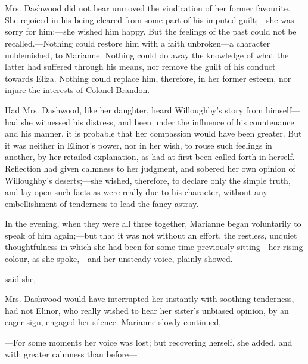 \chapter{} %

Mrs. Dashwood did not hear unmoved the vindication of her former favourite. She rejoiced in his being cleared from some part of his imputed guilt;---she was sorry for him;---she wished him happy. But the feelings of the past could not be recalled.---Nothing could restore him with a faith unbroken---a character unblemished, to Marianne. Nothing could do away the knowledge of what the latter had suffered through his means, nor remove the guilt of his conduct towards Eliza. Nothing could replace him, therefore, in her former esteem, nor injure the interests of Colonel Brandon.

Had Mrs. Dashwood, like her daughter, heard Willoughby's story from himself---had she witnessed his distress, and been under the influence of his countenance and his manner, it is probable that her compassion would have been greater. But it was neither in Elinor's power, nor in her wish, to rouse such feelings in another, by her retailed explanation, as had at first been called forth in herself. Reflection had given calmness to her judgment, and sobered her own opinion of Willoughby's deserts;---she wished, therefore, to declare only the simple truth, and lay open such facts as were really due to his character, without any embellishment of tenderness to lead the fancy astray.

In the evening, when they were all three together, Marianne began voluntarily to speak of him again;---but that it was not without an effort, the restless, unquiet thoughtfulness in which she had been for some time previously sitting---her rising colour, as she spoke,---and her unsteady voice, plainly showed.

 said she, 

Mrs. Dashwood would have interrupted her instantly with soothing tenderness, had not Elinor, who really wished to hear her sister's unbiased opinion, by an eager sign, engaged her silence. Marianne slowly continued,---

---For some moments her voice was lost; but recovering herself, she added, and with greater calmness than before---

